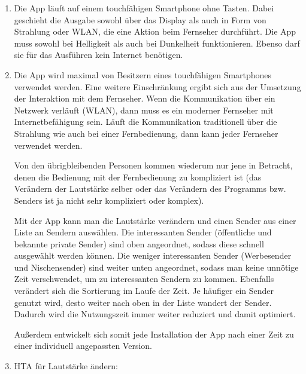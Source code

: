 \documentclass[a4paper,10pt]{scrartcl}
\begin{document}
\kopf
\renewcommand{\figurename}{Figure}


	\begin{enumerate}
		\item 
		Die App läuft auf einem touchfähigen Smartphone ohne Tasten. Dabei geschieht die Ausgabe sowohl über das Display als auch in Form von Strahlung oder WLAN, die eine Aktion beim Fernseher durchführt. Die App muss sowohl bei Helligkeit als auch bei Dunkelheit funktionieren. Ebenso darf sie für das Ausführen kein Internet benötigen.
		\item 
		Die App wird maximal von Besitzern eines touchfähigen Smartphones verwendet werden. Eine weitere Einschränkung ergibt sich aus der Umsetzung der Interaktion mit dem Fernseher. Wenn die Kommunikation über ein Netzwerk verläuft (WLAN), dann muss es ein moderner Fernseher mit Internetbefähigung sein. Läuft die Kommunikation traditionell über die Strahlung wie auch bei einer Fernbedienung, dann kann jeder Fernseher verwendet werden.
		
		Von den übrigbleibenden Personen kommen wiederum nur jene in Betracht, denen die Bedienung mit der Fernbedienung zu kompliziert ist (das Verändern der Lautstärke selber oder das Verändern des Programms bzw. Senders ist ja nicht sehr kompliziert oder komplex).
		
		Mit der App kann man die Lautstärke verändern und einen Sender aus einer Liste an Sendern auswählen. Die interessanten Sender (öffentliche und bekannte private Sender) sind oben angeordnet, sodass diese schnell ausgewählt werden können. Die weniger interessanten Sender (Werbesender und Nischensender) sind weiter unten angeordnet, sodass man keine unnötige Zeit verschwendet, um zu interessanten Sendern zu kommen. Ebenfalls verändert sich die Sortierung im Laufe der Zeit. Je häufiger ein Sender genutzt wird, desto weiter nach oben in der Liste wandert der Sender. Dadurch wird die Nutzungszeit immer weiter reduziert und damit optimiert.

		Außerdem entwickelt sich somit jede Installation der App nach einer Zeit zu einer individuell angepassten Version.
		\setcounter{enumi}{3}
		\item HTA für Lautstärke ändern: \\
\begin{tikzpicture}[
	goal/.style={rectangle,draw,fill=yellow!40,align=left},
	plan/.style={align=left},
	level 1/.style={sibling distance=7.7em},
	nextLevel/.style={level distance=40ex},
  	nextLevel2/.style={level distance=30ex},
  	nextLevel3/.style={level distance=18ex}]
	

\end{tikzpicture}
\end{enumerate}
\end{document}
